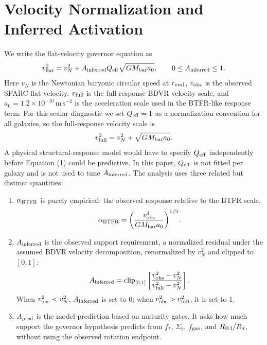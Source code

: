 \documentclass[11pt]{article}
\begin{document}
\section{Velocity Normalization and Inferred Activation}

We write the flat-velocity governor equation as
\begin{equation}
  v_{\rm flat}^2 = v_N^2 + A_{\rm inferred} Q_{\rm eff} \sqrt{G M_{\rm bar} a_0},\qquad 0\le A_{\rm inferred}\le 1 .
\end{equation}
Here $v_N$ is the Newtonian baryonic circular speed at $r_{\rm eval}$, $v_{\rm obs}$ is the observed SPARC flat velocity, $v_{\rm full}$ is the full-response BDVR velocity scale, and $a_0=1.2\times10^{-10}\,\mathrm{m\,s^{-2}}$ is the acceleration scale used in the BTFR-like response term. For this scalar diagnostic we set $Q_{\rm eff}=1$ as a normalization convention for all galaxies, so the full-response velocity scale is
\begin{equation}
  v_{\rm full}^2=v_N^2+\sqrt{G M_{\rm bar} a_0} .
\end{equation}
A physical structural-response model would have to specify $Q_{\rm eff}$ independently before Equation (1) could be predictive. In this paper, $Q_{\rm eff}$ is not fitted per galaxy and is not used to tune $A_{\rm inferred}$. The analysis uses three related but distinct quantities:
\begin{enumerate}
\item $\alpha_{\rm BTFR}$ is purely empirical: the observed response relative to the BTFR scale,
\begin{equation}
  \alpha_{\rm BTFR}=\left(\frac{v_{\rm obs}^4}{G M_{\rm bar}a_0}\right)^{1/2} .
\end{equation}
\item $A_{\rm inferred}$ is the observed support requirement, a normalized residual under the assumed BDVR velocity decomposition, renormalized by $v_N^2$ and clipped to $[0,1]$:
\begin{equation}
  A_{\rm inferred} = {\rm clip}_{[0,1]}\left[\frac{v_{\rm obs}^2-v_N^2}{v_{\rm full}^2-v_N^2}\right].
\end{equation}
When $v_{\rm obs}^2<v_N^2$, $A_{\rm inferred}$ is set to 0; when $v_{\rm obs}^2>v_{\rm full}^2$, it is set to 1.
\item $A_{\rm pred}$ is the model prediction based on maturity gates. It asks how much support the governor hypothesis predicts from $f_*$, $\Sigma_b$, $f_{\rm gas}$, and $R_{\rm H\,I}/R_d$, without using the observed rotation endpoint.
\end{enumerate}
\end{document}
